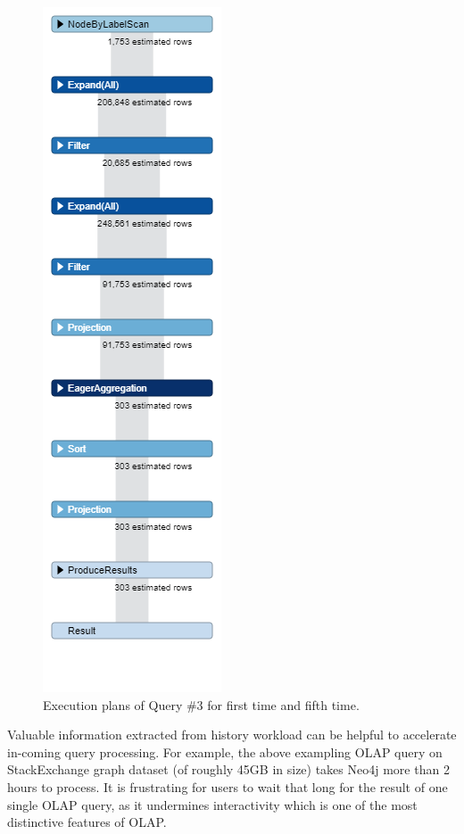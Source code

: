 \begin{figure}[H]
\includegraphics[scale=0.4]{pic/5.png}
\caption{Execution plans of Query \#3 for first time and fifth time.}

\end{figure}

Valuable information extracted from history workload can be helpful to accelerate in-coming query processing. For example, the above exampling OLAP query on StackExchange graph dataset (of roughly 45GB in size) takes Neo4j more than 2 hours to process. It is frustrating for users to wait that long for the result of one single OLAP query, as it undermines interactivity which is one of the most distinctive features of OLAP. %

